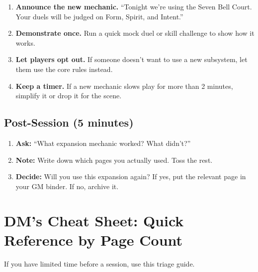 \begin{enumerate}
\item \textbf{Announce the new mechanic.} ``Tonight we're using the Seven Bell Court. Your duels will be judged on Form, Spirit, and Intent.''
\item \textbf{Demonstrate once.} Run a quick mock duel or skill challenge to show how it works.
\item \textbf{Let players opt out.} If someone doesn't want to use a new subsystem, let them use the core rules instead.
\item \textbf{Keep a timer.} If a new mechanic slows play for more than 2 minutes, simplify it or drop it for the scene.
\end{enumerate}

\subsection{Post-Session (5 minutes)}

\begin{enumerate}
\item \textbf{Ask:} ``What expansion mechanic worked? What didn't?''
\item \textbf{Note:} Write down which pages you actually used. Toss the rest.
\item \textbf{Decide:} Will you use this expansion again? If yes, put the relevant page in your GM binder. If no, archive it.
\end{enumerate}

\section{DM's Cheat Sheet: Quick Reference by Page Count}

If you have limited time before a session, use this triage guide.

